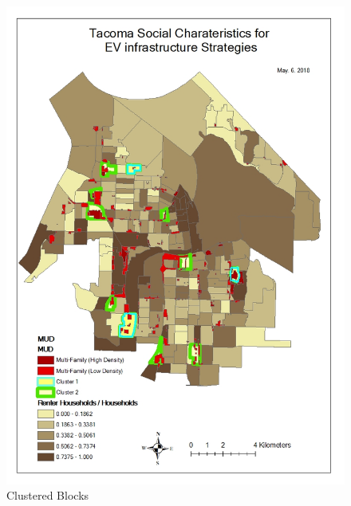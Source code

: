 \documentclass[]{article}
\begin{document}
\begin{figure}
\centering
\includegraphics{./figs/cluster.jpg}
\caption{Clustered Blocks}
\end{figure}
\end{document}
